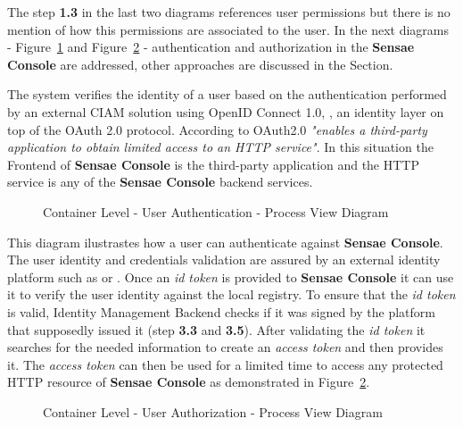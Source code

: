 The step \textbf{1.3} in the last two diagrams references user permissions but there is no mention of how this permissions are associated to the user. In the next diagrams - Figure~\ref{fig:design:architecture:container:process:diagram:authentication} and Figure~\ref{fig:design:architecture:container:process:diagram:authorization} - authentication and authorization in the \textbf{Sensae Console} are addressed, other approaches are discussed in the  Section.

The system verifies the identity of a user based on the authentication performed by an external \gls{CIAM} solution using OpenID Connect 1.0, \cite{openid}, an identity layer on top of the OAuth 2.0 protocol. According to \cite{oauth} OAuth2.0 \textit{"enables a third-party application to obtain limited access to an HTTP service"}. In this situation the Frontend of \textbf{Sensae Console} is the third-party application and the HTTP service is any of the \textbf{Sensae Console} backend services.

\begin{figure}[H]
   \centering
   \resizebox{\columnwidth}{!}
   {      
      
   }
   \caption[Container Level - User Authentication - Process View Diagram]{Container Level - User Authentication - Process View Diagram}
   \label{fig:design:architecture:container:process:diagram:authentication}
\end{figure}

This diagram ilustrastes how a user can authenticate against \textbf{Sensae Console}.
The user identity and credentials validation are assured by an external identity platform such as  or . Once an \textit{id token} is provided to \textbf{Sensae Console} it can use it to verify the user identity against the local registry. To ensure that the \textit{id token} is valid, Identity Management Backend checks if it was signed by the platform that supposedly issued it (step \textbf{3.3} and \textbf{3.5}). After validating the \textit{id token} it searches for the needed information to create an \textit{access token} and then provides it. The \textit{access token} can then be used for a limited time to access any protected HTTP resource of \textbf{Sensae Console} as demonstrated in Figure~\ref{fig:design:architecture:container:process:diagram:authorization}.

\begin{figure}[H]
   \centering
   \resizebox{\columnwidth}{!}
   {
      
   }
   \caption[Container Level - User Authorization - Process View Diagram]{Container Level - User Authorization - Process View Diagram}
   \label{fig:design:architecture:container:process:diagram:authorization}
\end{figure}

